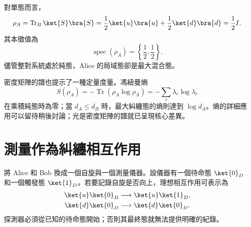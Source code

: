對單態而言，
\begin{equation}
\rho_A
=\operatorname{Tr}_B\ket{S}\bra{S}
=\frac12\ket{u}\bra{u}
+\frac12\ket{d}\bra{d}
=\frac12 I.
\label{eq:l7-singlet-reduced-density}
\end{equation}
其本徵值為
\begin{equation}
\operatorname{spec}(\rho_A)
=\left\{\frac12,\frac12\right\}.
\end{equation}
儘管整對系統處於純態，Alice 的局域態卻是最大混合態。

密度矩陣的譜也提示了一種定量度量。馮紐曼熵
\begin{equation}
S(\rho_A)
=-\operatorname{Tr}(\rho_A\log\rho_A)
=-\sum_r\lambda_r\log\lambda_r
\label{eq:l7-entanglement-entropy}
\end{equation}
在乘積純態時為零；當 \(d_A\leq d_B\) 時，最大糾纏態的熵則達到 \(\log d_A\)。熵的詳細應用可以留待稍後討論；光是密度矩陣的譜就已呈現核心差異。

\begin{classroomqa}
\end{classroomqa}

\begin{classroomqa}
\end{classroomqa}

\begin{classroomqa}
\end{classroomqa}

\section{測量作為糾纏相互作用}

將 Alice 和 Bob 換成一個自旋與一個測量儀器。設儀器有一個待命態 \(\ket{0}_D\) 和一個觸發態 \(\ket{1}_D\)。若要記錄自旋是否向上，理想相互作用可表示為
\begin{align}
\ket{u}\ket{0}_D&\longrightarrow\ket{u}\ket{1}_D,\\
\ket{d}\ket{0}_D&\longrightarrow\ket{d}\ket{0}_D.
\label{eq:l7-measurement-basis-map}
\end{align}
探測器必須從已知的待命態開始；否則其最終態就無法提供明確的紀錄。

